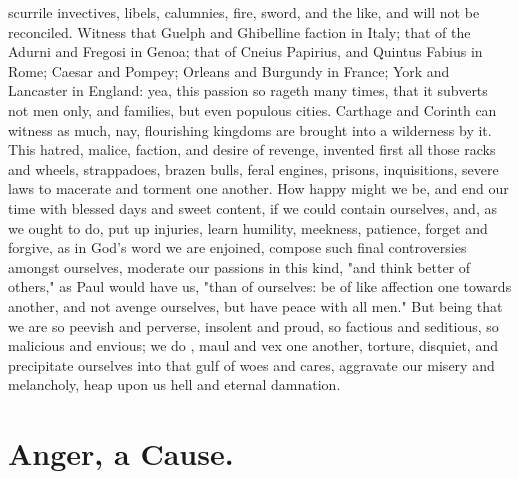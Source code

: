 scurrile invectives, libels, calumnies, fire, sword, and the like, and will not
be reconciled. Witness that Guelph and Ghibelline faction in Italy; that of the
Adurni and Fregosi in Genoa; that of Cneius Papirius, and Quintus Fabius in
Rome; Caesar and Pompey; Orleans and Burgundy in France; York and Lancaster in
England: yea, this passion so rageth many times, that it
subverts not men only, and families, but even populous cities.
Carthage and Corinth can witness as much, nay, flourishing
kingdoms are brought into a wilderness by it. This hatred, malice, faction, and
desire of revenge, invented first all those racks and wheels, strappadoes,
brazen bulls, feral engines, prisons, inquisitions, severe laws to macerate and
torment one another. How happy might we be, and end our time with blessed days
and sweet content, if we could contain ourselves, and, as we ought to do, put
up injuries, learn humility, meekness, patience, forget and forgive, as in
God's word we are enjoined, compose such final
controversies amongst ourselves, moderate our passions in this kind, "and think
better of others," as Paul would have us, "than of
ourselves: be of like affection one towards another, and not avenge ourselves,
but have peace with all men." But being that we are so peevish and perverse,
insolent and proud, so factious and seditious, so malicious and envious; we do
, maul and vex one another, torture, disquiet, and
precipitate ourselves into that gulf of woes and cares, aggravate our misery
and melancholy, heap upon us hell and eternal damnation.

\section{Anger, a Cause.}


